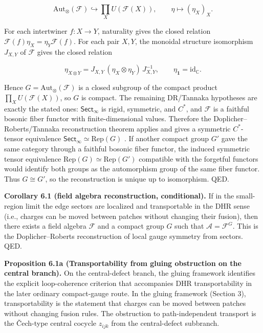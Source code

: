 \[
\mathrm{Aut}_\otimes(\mathcal F) \hookrightarrow \prod_X U(\mathcal F(X)), \qquad \eta \mapsto (\eta_X)_X.
\]

For each intertwiner \(f:X\to Y\), naturality gives the closed relation \(\mathcal F(f)\eta_X=\eta_Y\mathcal F(f)\). For each pair \(X,Y\), the monoidal structure isomorphism \(J_{X,Y}\) of \(\mathcal F\) gives the closed relation

\[
\eta_{X\otimes Y}=J_{X,Y}\,(\eta_X\otimes\eta_Y)\,J_{X,Y}^{-1},
\qquad
\eta_{\mathbf 1}=\mathrm{id}_{\mathbb C}.
\]

Hence \(G=\mathrm{Aut}_\otimes(\mathcal F)\) is a closed subgroup of the compact product \(\prod_X U(\mathcal F(X))\), so \(G\) is compact. The remaining DR/Tannaka hypotheses are exactly the stated ones: \(\mathsf{Sect}_\infty\) is rigid, symmetric, and \(C^*\), and \(\mathcal F\) is a faithful bosonic fiber functor with finite-dimensional values. Therefore the Doplicher--Roberts/Tannaka reconstruction theorem applies and gives a symmetric \(C^*\)-tensor equivalence \(\mathsf{Sect}_\infty \simeq \mathrm{Rep}(G)\) \cite{dr89,dr90}. If another compact group \(G'\) gave the same category through a faithful bosonic fiber functor, the induced symmetric tensor equivalence \(\mathrm{Rep}(G)\simeq\mathrm{Rep}(G')\) compatible with the forgetful functors would identify both groups as the automorphism group of the same fiber functor. Thus \(G\cong G'\), so the reconstruction is unique up to isomorphism. QED.

\textbf{Corollary 6.1 (field algebra reconstruction, conditional).} If in the small-region limit the edge sectors are localized and transportable in the DHR sense (i.e., charges can be moved between patches without changing their fusion), then there exists a field algebra \(\mathcal F\) and a compact group \(G\) such that \(\mathcal A = \mathcal F^G\). This is the Doplicher--Roberts reconstruction of local gauge symmetry from sectors. QED.

\textbf{Proposition 6.1a (Transportability from gluing obstruction on the central branch).} On the central-defect branch, the gluing framework identifies the explicit loop-coherence criterion that accompanies DHR transportability in the later ordinary compact-gauge route. In the gluing framework (Section 3), transportability is the statement that charges can be moved between patches without changing fusion rules. The obstruction to path-independent transport is the \v{C}ech-type central cocycle \(z_{ijk}\) from the central-defect subbranch.

